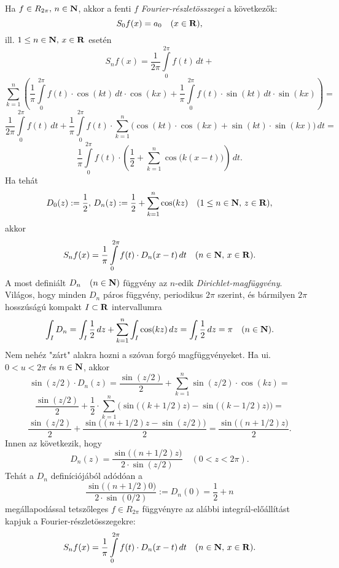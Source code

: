 Ha $f \in R_{2\pi}, \, n \in \mathbf{N}$, akkor a fenti $f$ \textit{Fourier-részletösszegei} a következők:
\[
	S_0f(x) = a_0 \quad (x \in \mathbf{R}),
\]
ill. $1 \leq n \in \mathbf{N}, \, x \in \mathbf{R}$ esetén
\[
	S_nf(x) = \frac{1}{2\pi} \int\limits_0^{2\pi} f(t) \, dt +
\]
\[
	\sum_{k=1}^n \left( \frac{1}{\pi} \int\limits_0^{2\pi} f(t) \cdot \cos(kt) \, dt \cdot \cos(kx) + \frac{1}{\pi} \int\limits_0^{2\pi} f(t) \cdot \sin(kt) \, dt \cdot \sin(kx) \right) =
\]
\[
	\frac{1}{2\pi} \int\limits_0^{2\pi} f(t) \, dt + \frac{1}{\pi} \int\limits_0^{2\pi} f(t) \cdot \sum_{k=1}^n \Big( \cos(kt) \cdot \cos(kx) + \sin(kt) \cdot \sin(kx) \Big) \, dt =
\]
\[
	\frac{1}{\pi} \int\limits_0^{2\pi} f(t) \cdot \left( \frac{1}{2} + \sum_{k=1}^n \cos\Big(k(x-t)\Big) \right) \, dt.
\]
Ha tehát
\[
	D_0(z) := \frac{1}{2}, \, D_n(z) := \frac{1}{2} + \sum_{k=1}^n \cos(kz) \quad (1 \leq n \in \mathbf{N}, \, z \in \mathbf{R}),
\]
akkor
\[
	S_nf(x) = \frac{1}{\pi} \int\limits_0^{2\pi} f(t) \cdot D_n(x-t) \, dt \quad (n \in \mathbf{N}, \, x \in \mathbf{R}).
\]
A most definiált $D_n \quad (n \in \mathbf{N})$ függvény az $n$-edik \textit{Dirichlet-magfüggvény}. Világos, hogy minden $D_n$ páros függvény, periodikus $2\pi$ szerint, és bármilyen $2\pi$ hosszúságú kompakt $I \subset \mathbf{R}$ intervallumra
\[
	\int_I D_n = \int_I \frac{1}{2} \, dz + \sum_{k=1}^n \int_I \cos(kz) \, dz = \int_I \frac{1}{2} \, dz = \pi \quad (n \in \mathbf{N}).
\]
Nem nehéz "zárt" alakra hozni a szóvan forgó magfüggvényeket. Ha ui. $0 < u < 2\pi$ és $n \in \mathbf{N}$, akkor
\[
	\sin(z/2) \cdot D_n(z) = \frac{\sin(z/2)}{2} + \sum_{k=1}^n \sin(z/2) \cdot \cos(kz) =
\]
\[
	\frac{\sin(z/2)}{2} + \frac{1}{2} \cdot \sum_{k=1}^n \Bigg( \sin\Big( (k+ 1/2)z \Big) - \sin\Big( (k-1/2)z \Big) \Bigg) =
\]
\[
	\frac{\sin(z/2)}{2} + \frac{\sin\Big( (n+1 / 2)z  - \sin(z/2) \Big)}{2} = \frac{\sin\Big( (n+1/2)z \Big)}{2}.
\]
Innen az következik, hogy
\[
	D_n(z) = \frac{\sin\Big( (n+1/2)z \Big)}{2 \cdot \sin(z/2)} \quad (0 < z < 2\pi).
\]
Tehát a $D_n$ definíciójából adódóan a
\[
	\frac{\sin\Big( (n+1/2)0 \Big)}{2 \cdot \sin(0/2)} := D_n(0) = \frac{1}{2} + n
\]
megállapodással tetszőleges $f \in R_{2\pi}$ függvényre az alábbi integrál-előállítást kapjuk a Fourier-részletösszegekre:
\[
	S_nf(x) = \frac{1}{\pi} \int\limits_0^{2\pi} f(t) \cdot D_n(x-t) \, dt \quad (n \in \mathbf{N}, \, x \in \mathbf{R}).
\]


